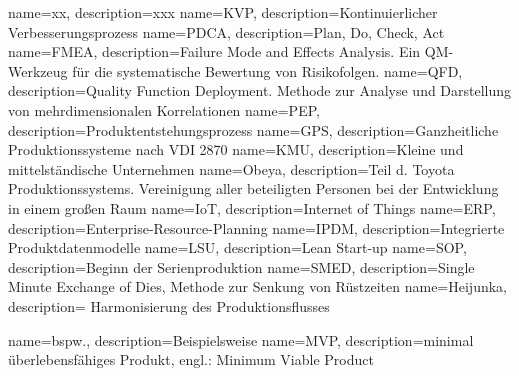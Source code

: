 %
{
  name=xx, 
  description={xxx}
}
%
%
{
  name=KVP, 
  description={Kontinuierlicher Verbesserungsprozess}
}
%
%
{
  name=PDCA, 
  description={Plan, Do, Check, Act}
}
%
%
{
  name=FMEA, 
  description={Failure Mode and Effects Analysis. Ein QM-Werkzeug für die systematische Bewertung von Risikofolgen.}
}
%
%
{
  name=QFD, 
  description={Quality Function Deployment. Methode zur Analyse und Darstellung von mehrdimensionalen Korrelationen}
}
%
%
{
  name=PEP, 
  description={Produktentstehungsprozess}
}
%
%
{
  name=GPS, 
  description={Ganzheitliche Produktionssysteme nach VDI 2870}
}
%
%
{
  name=KMU, 
  description={Kleine und mittelständische Unternehmen}
}
%
%
{
  name=Obeya, 
  description={Teil d. Toyota Produktionssystems. Vereinigung aller beteiligten Personen bei der Entwicklung in einem großen Raum}
}
%
{
  name=IoT, 
  description={Internet of Things}
}
%
%
{
  name=ERP, 
  description={Enterprise-Resource-Planning}
}
%
{
  name=IPDM, 
  description={Integrierte Produktdatenmodelle}
}
%
{
  name=LSU, 
  description={Lean Start-up}
}
%
{
  name=SOP, 
  description={Beginn der Serienproduktion}
}
%
{
  name=SMED, 
  description={Single Minute Exchange of Dies, Methode zur Senkung von Rüstzeiten}
}
%
{
  name=Heijunka, 
  description={
Harmonisierung des Produktionsflusses}
}

{
  name=bspw.,
  description={Beispielsweise}
}
%
{  
  name=MVP,
  description={minimal überlebensfähiges Produkt, engl.: Minimum Viable
Product}
}
